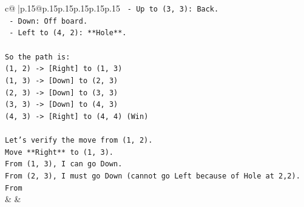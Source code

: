 \documentclass{article}
\begin{document}
{\begin{supertabular}{c@{$\;$}|p{.15\linewidth}@{}p{.15\linewidth}p{.15\linewidth}p{.15\linewidth}p{.15\linewidth}p{.15\linewidth}}
{{{\texttt{    {-} Up to (3, 3): Back.} \\
\texttt{    {-} Down: Off board.} \\
\texttt{    {-} Left to (4, 2): **Hole**.} \\
\\ 
\texttt{So the path is:} \\
\texttt{(1, 2) {-}> {[}Right{]} to (1, 3)} \\
\texttt{(1, 3) {-}> {[}Down{]} to (2, 3)} \\
\texttt{(2, 3) {-}> {[}Down{]} to (3, 3)} \\
\texttt{(3, 3) {-}> {[}Down{]} to (4, 3)} \\
\texttt{(4, 3) {-}> {[}Right{]} to (4, 4) (Win)} \\
\\ 
\texttt{Let's verify the move from (1, 2).} \\
\texttt{Move **Right** to (1, 3).} \\
\texttt{From (1, 3), I can go Down.} \\
\texttt{From (2, 3), I must go Down (cannot go Left because of Hole at 2,2).} \\
\texttt{From} \\
            }
        }
    }
    & & \\ \\


\end{supertabular}}
\end{document}
